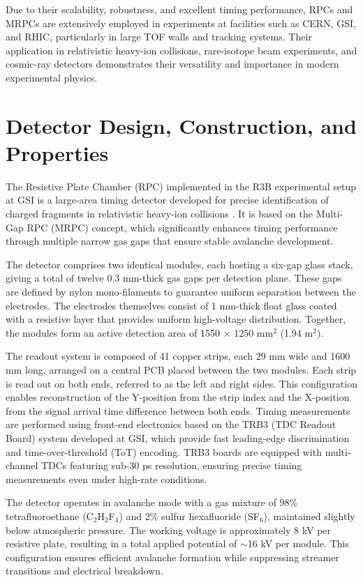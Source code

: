 Due to their scalability, robustness, and excellent timing performance, \gls{RPC}s and MRPCs are extensively employed in experiments at facilities such as CERN, GSI, and RHIC, particularly in large TOF walls and tracking systems. Their application in relativistic heavy-ion collisions, rare-isotope beam experiments, and cosmic-ray detectors demonstrates their versatility and importance in modern experimental physics.

\section{Detector Design, Construction, and Properties}

The Resistive Plate Chamber (\gls{RPC}) implemented in the \gls{R3B} experimental setup at GSI is a large-area timing detector developed for precise identification of charged fragments in relativistic heavy-ion collisions \cite{blanco_ship_2020}. It is based on the Multi-Gap \gls{RPC} (MRPC) concept, which significantly enhances timing performance through multiple narrow gas gaps that ensure stable avalanche development.

The detector comprises two identical modules, each hosting a six-gap glass stack, giving a total of twelve 0.3 mm-thick gas gaps per detection plane. These gaps are defined by nylon mono-filaments to guarantee uniform separation between the electrodes. The electrodes themselves consist of 1 mm-thick float glass coated with a resistive layer that provides uniform high-voltage distribution. Together, the modules form an active detection area of 1550 × 1250 mm$^2$ (1.94 m$^2$).

The readout system is composed of 41 copper strips, each 29 mm wide and 1600 mm long, arranged on a central PCB placed between the two modules. Each strip is read out on both ends, referred to as the left and right sides. This configuration enables reconstruction of the Y-position from the strip index and the X-position from the signal arrival time difference between both ends. Timing measurements are performed using front-end electronics based on the TRB3 (TDC Readout Board) \cite{neiser_trb3_2013} system developed at GSI, which provide fast leading-edge discrimination and time-over-threshold (ToT) encoding. TRB3 boards are equipped with multi-channel TDCs featuring sub-30 ps resolution, ensuring precise timing measurements even under high-rate conditions.

The detector operates in avalanche mode with a gas mixture of 98\% tetrafluoroethane (C$_2$H$_2$F$_4$) and 2\% sulfur hexafluoride (SF$_6$), maintained slightly below atmospheric pressure. The working voltage is approximately 8 kV per resistive plate, resulting in a total applied potential of $\sim$16 kV per module. This configuration ensures efficient avalanche formation while suppressing streamer transitions and electrical breakdown.

